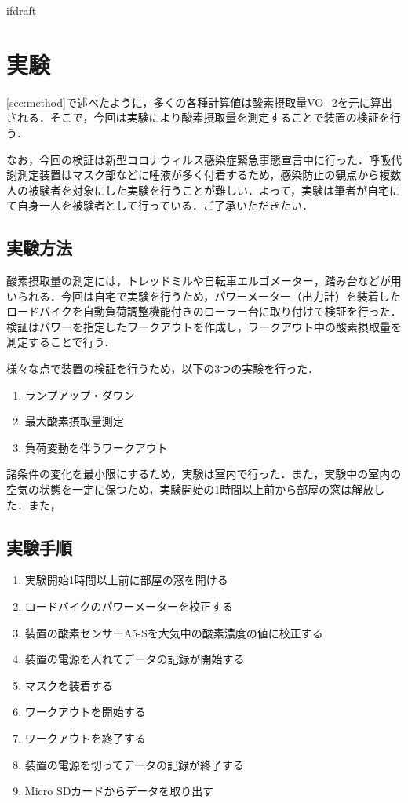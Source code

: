 \expandafter\ifx\csname ifdraft\endcsname\relax
 
\fi

\section{実験}

\ref{sec:method}で述べたように，多くの各種計算値は酸素摂取量VO_2を元に算出される．そこで，今回は実験により酸素摂取量を測定することで装置の検証を行う．

なお，今回の検証は新型コロナウィルス感染症緊急事態宣言中に行った．呼吸代謝測定装置はマスク部などに唾液が多く付着するため，感染防止の観点から複数人の被験者を対象にした実験を行うことが難しい．よって，実験は筆者が自宅にて自身一人を被験者として行っている．ご了承いただきたい．

\subsection{実験方法}

酸素摂取量の測定には，トレッドミルや自転車エルゴメーター，踏み台などが用いられる．今回は自宅で実験を行うため，パワーメーター（出力計）を装着したロードバイクを自動負荷調整機能付きのローラー台に取り付けて検証を行った．
検証はパワーを指定したワークアウトを作成し，ワークアウト中の酸素摂取量を測定することで行う．

様々な点で装置の検証を行うため，以下の3つの実験を行った．

\begin{enumerate}
  \item ランプアップ・ダウン
  \item 最大酸素摂取量測定
  \item 負荷変動を伴うワークアウト
\end{enumerate}

諸条件の変化を最小限にするため，実験は室内で行った．また，実験中の室内の空気の状態を一定に保つため，実験開始の1時間以上前から部屋の窓は解放した．また，

\subsection{実験手順}

\begin{enumerate}
  \item 実験開始1時間以上前に部屋の窓を開ける
  \item ロードバイクのパワーメーターを校正する
  \item 装置の酸素センサーA5-Sを大気中の酸素濃度の値に校正する
  \item 装置の電源を入れてデータの記録が開始する
  \item マスクを装着する
  \item ワークアウトを開始する
  \item ワークアウトを終了する
  \item 装置の電源を切ってデータの記録が終了する
  \item Micro SDカードからデータを取り出す
\end{enumerate}

